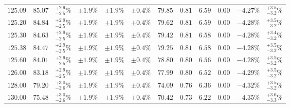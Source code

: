 \begin{landscape}
\begin{table}[ht!]
{\begin{tabular}{| cc | c | ccc | ccccc | c |}
$125.09$ & $85.07$ & $^{+2.9}_{-2.5}\%$ & $\pm 1.9\%$ & {\color{black!55}$\pm 1.9\%$} & {\color{black!55}$\pm 0.4\%$} & $79.85$ & $0.81$ & $6.59$ & $0.00$ & $-4.27\%$ & $^{+3.5}_{-3.2}\%$ \\
$125.20$ & $84.84$ & $^{+2.9}_{-2.5}\%$ & $\pm 1.9\%$ & {\color{black!55}$\pm 1.9\%$} & {\color{black!55}$\pm 0.4\%$} & $79.62$ & $0.81$ & $6.59$ & $0.00$ & $-4.28\%$ & $^{+3.5}_{-3.2}\%$ \\
$125.30$ & $84.63$ & $^{+2.9}_{-2.5}\%$ & $\pm 1.9\%$ & {\color{black!55}$\pm 1.9\%$} & {\color{black!55}$\pm 0.4\%$} & $79.42$ & $0.81$ & $6.58$ & $0.00$ & $-4.28\%$ & $^{+3.4}_{-3.2}\%$ \\
$125.38$ & $84.47$ & $^{+2.9}_{-2.5}\%$ & $\pm 1.9\%$ & {\color{black!55}$\pm 1.9\%$} & {\color{black!55}$\pm 0.4\%$} & $79.25$ & $0.81$ & $6.58$ & $0.00$ & $-4.28\%$ & $^{+3.5}_{-3.2}\%$ \\
$125.60$ & $84.01$ & $^{+2.9}_{-2.5}\%$ & $\pm 1.9\%$ & {\color{black!55}$\pm 1.9\%$} & {\color{black!55}$\pm 0.4\%$} & $78.80$ & $0.80$ & $6.56$ & $0.00$ & $-4.28\%$ & $^{+3.5}_{-3.2}\%$ \\
$126.00$ & $83.18$ & $^{+2.9}_{-2.5}\%$ & $\pm 1.9\%$ & {\color{black!55}$\pm 1.9\%$} & {\color{black!55}$\pm 0.4\%$} & $77.99$ & $0.80$ & $6.52$ & $0.00$ & $-4.29\%$ & $^{+3.5}_{-3.2}\%$ \\
$128.00$ & $79.20$ & $^{+3.0}_{-2.6}\%$ & $\pm 1.9\%$ & {\color{black!55}$\pm 1.9\%$} & {\color{black!55}$\pm 0.4\%$} & $74.09$ & $0.76$ & $6.36$ & $0.00$ & $-4.32\%$ & $^{+3.5}_{-3.2}\%$ \\
$130.00$ & $75.48$ & $^{+3.0}_{-2.6}\%$ & $\pm 1.9\%$ & {\color{black!55}$\pm 1.9\%$} & {\color{black!55}$\pm 0.4\%$} & $70.42$ & $0.73$ & $6.22$ & $0.00$ & $-4.35\%$ & $^{+3.6}_{-3.3}\%$ \\
\cline{1-12}
\end{tabular}
}
\end{table}


\end{landscape}
